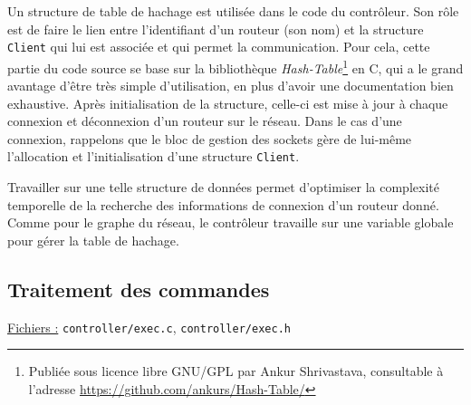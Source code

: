 \documentclass[a4paper,11pt]{article}
\begin{document}
Un structure de table de hachage est utilisée dans le code du contrôleur. Son rôle est de faire le lien entre l'identifiant d'un routeur (son nom) et la structure \texttt{Client} qui lui est associée et qui permet la communication. Pour cela, cette partie du code source se base sur la bibliothèque \textit{Hash-Table}\footnote{Publiée sous licence libre GNU/GPL par Ankur Shrivastava, consultable à l'adresse \url{https://github.com/ankurs/Hash-Table/}} en C, qui a le grand avantage d'être très simple d'utilisation, en plus d'avoir une documentation bien exhaustive. Après initialisation de la structure, celle-ci est mise à jour à chaque connexion et déconnexion d'un routeur sur le réseau. Dans le cas d'une connexion, rappelons que le bloc de gestion des sockets gère de lui-même l'allocation et l'initialisation d'une structure \texttt{Client}.

Travailler sur une telle structure de données permet d'optimiser la complexité temporelle de la recherche des informations de connexion d'un routeur donné. Comme pour le graphe du réseau, le contrôleur travaille sur une variable globale pour gérer la table de hachage.

\subsection{Traitement des commandes}

\underline{Fichiers :} \texttt{controller/exec.c}, \texttt{controller/exec.h}\\
\end{document}
